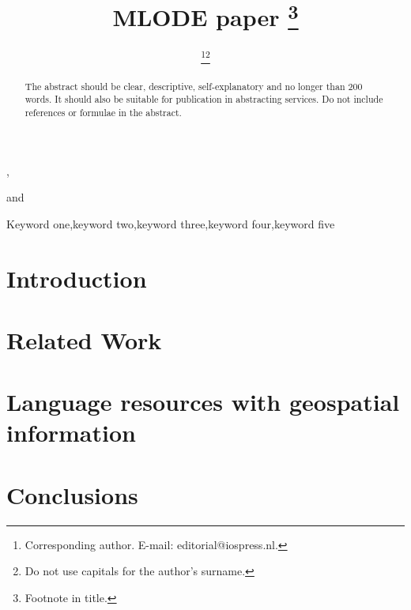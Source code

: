 \documentclass{iosart2c}
\begin{document}
\begin{frontmatter}                           %

%
\title{MLODE paper \thanks{Footnote in title.}}




\author[A]{ \thanks{Corresponding author. E-mail: editorial@iospress.nl.}\thanks{Do not use capitals for the author's surname.}},
\author[B]{ }
and
\author[C]{ }
\address[A]{Journal Production Department, IOS Press, Nieuwe Hemweg 6b, 1013 BG, Amsterdam,\\ The Netherlands\\
E-mail: first@somewhere.com}
\address[B]{Department first, then University or Company name, Insert a complete correspondence (mailing) address,
Abbreviate US states, Include country\\
E-mail: \{second,third\}@somewhere.com}
\address[C]{Intelligent Software Components, iSOCO, S.A., Av. del Partenon 16-18, Madrid, Spain\\
E-mail: \{bvillazon\}@isoco.com}

\begin{abstract}
The abstract should be clear, descriptive, self-explanatory and no longer than 200 words. It should also
be suitable for publication in abstracting services. Do not include references or formulae in the abstract.
\end{abstract}

\begin{keyword}
Keyword one\sep keyword two\sep keyword three\sep keyword four\sep keyword five
\end{keyword}

\end{frontmatter}


\section{Introduction}


\section{Related Work}


\section{Language resources with geospatial information}


\section{Conclusions}

\end{document}
